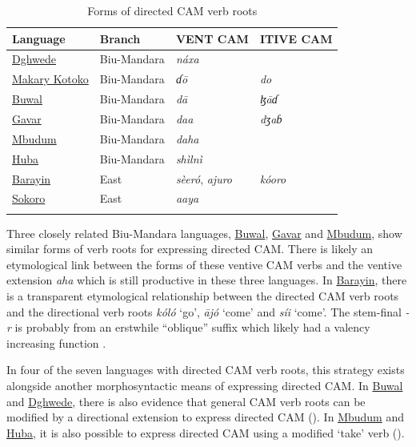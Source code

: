 \begin{table}
	\caption{Forms of directed CAM verb roots} 
	\label{tab:dcamverbs}
	\begin{tabular}{llll} %
		\lsptoprule
		Language & Branch & VENT CAM & ITIVE CAM   \\ %
		\midrule
		\hyperref[dghw]{Dghwede} & Biu-Mandara & \textit{náxa} & \\
		\hyperref[maka]{Makary Kotoko} & Biu-Mandara & \textit{ɗō} &  \textit{do}  \\
		\hyperref[buwa]{Buwal} & Biu-Mandara & \textit{dā} & \textit{ɮāɗ} \\
		\hyperref[gava]{Gavar} & Biu-Mandara & \textit{daa} & \textit{dʒaɓ} \\
		\hyperref[mbud]{Mbudum} & Biu-Mandara & \textit{daha} & \\
		\hyperref[huba]{Huba} & Biu-Mandara & \textit{shìlnì} & \\
		\hyperref[bara]{Barayin} & East &  \textit{sèeró}, \textit{ajuro} & \textit{kóoro} \\
		\hyperref[soko]{Sokoro} & East & \textit{aaya} &  \\
		\lspbottomrule
	\end{tabular}
\end{table}

Three closely related Biu-Mandara languages, \hyperref[buwa]{Buwal}, \hyperref[gava]{Gavar} and \hyperref[mbud]{Mbudum}, show similar forms of verb roots for expressing directed CAM. There is likely an etymological link between the forms of these ventive CAM verbs and the ventive extension \textit{aha} which is still productive in these three languages. In \hyperref[bara]{Barayin}, there is a transparent etymological relationship between the directed CAM verb roots and the directional verb roots \textit{kóló} `go', \textit{ājó} `come' and \textit{síi} `come'. The stem-final \textit{-r} is probably from an erstwhile ``oblique'' suffix which likely had a valency increasing function \citep{robertsObliquesMawa2016}. 

In four of the seven languages with directed CAM verb roots, this strategy exists alongside another morphosyntactic means of expressing directed CAM. In \hyperref[buwa]{Buwal} and \hyperref[dghw]{Dghwede}, there is also evidence that general CAM verb roots can be modified by a directional extension to express directed CAM (). In \hyperref[mbud]{Mbudum} and \hyperref[huba]{Huba}, it is also possible to express directed CAM using a modified `take' verb ().


